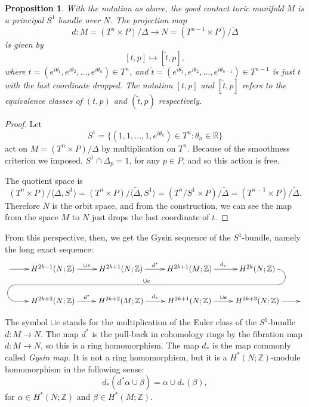 \documentclass[12pt]{amsart}
\newtheorem{proposition}[theorem]{Proposition}
\theoremstyle{definition}
\numberwithin{equation}{section}
\begin{document}
\begin{proposition}\label{S1 bundle}
With the notation as above, the good contact toric manifold $M$ is a
principal $S^{1}$ bundle over $N$. The projection map
\[d: M=(T^n\times P)/\Delta \rightarrow  N=(T^{n-1}\times P)/\widetilde{\Delta}\]
is given by
\[[t,p]\mapsto [\tilde{t},p],\]
where $t=(e^{i\theta_{1}},e^{i\theta_{2}},...,e^{i\theta_{n}})\in
T^n$, and
$\tilde{t}=(e^{i\theta_{1}},e^{i\theta_{2}},...,e^{i\theta_{n-1}})\in
T^{n-1}$ is just $t$ with the last coordinate dropped. The notation
$[t,p]$ and $[\tilde{t},p]$ refers to the equivalence classes of
$(t,p)$ and $(\tilde{t},p)$ respectively.
\end{proposition}
\begin{proof}
Let
\begin{equation}
S^1=\{(1,1,...,1,e^{i\theta_{n}})\in T^n: \theta_{n}\in {{\mathbb{R}}}\}
\end{equation}
act on $M=(T^n\times P)/\Delta$ by multiplication on $T^n$. Because
of the smoothness criterion we imposed, $S^1\cap \Delta_{p}=1$, for
any $p\in P$, and so this action is free.

The quotient space is
\begin{equation}
(T^n\times P)/\langle \Delta, S^1\rangle = (T^n\times P)/\langle
\widetilde{\Delta}, S^1 \rangle = (T^n/S^1\times
P)/\widetilde{\Delta} = (T^{n-1}\times P)/\widetilde{\Delta}.
\end{equation}
Therefore $N$ is the orbit space, and from the construction, we can
see the map from the space $M$ to $N$ just drops the last coordinate
of $t$.
\end{proof}

From this perspective, then, we get the Gysin sequence of the
$S^1$-bundle, namely the long exact sequence:
\[
\xymatrix{
   \ar[r]^{} & H^{2k-1}(N;{{\mathbb{Z}}}) \ar[r]^{\cup e} & H^{2k+1}(N;{{\mathbb{Z}}}) \ar[r]^{d^{*}} & H^{2k+1}(M;{{\mathbb{Z}}}) \ar[r]^{d_{*}} &
   H^{2k}(N;{{\mathbb{Z}}})\ar`r[d]`[l] `[lllld]_{\cup e}`[dlll][dlll]
&\\
&H^{2k+2}(N;{{\mathbb{Z}}}) \ar[r]^{d^{*}} & H^{2k+2}(M;{{\mathbb{Z}}}) \ar[r]^{d_{*}} &
H^{2k+1}(N;{{\mathbb{Z}}}) \ar[r]^{\cup e}& H^{2k+3}(N;{{\mathbb{Z}}}) \ar[r] & }\]

The symbol $\cup e$ stands for the multiplication of the Euler class
of the $S^1$-bundle $d: M\rightarrow N$. The map $d^{*}$ is the
pull-back in cohomology rings by the fibration map $d: M\rightarrow
N$, so this is a ring homomorphism. The map $d_{*}$ is the map
commonly called {\em Gysin map}. It is not a ring homomorphism, but
it is a $H^{*}(N;{{\mathbb{Z}}})$-module homomorphism in the following sense:
\begin{equation}\label{eq:push-pull}
d_{*}(d^{*}\alpha \cup \beta)= \alpha\cup d_{*}(\beta),
\end{equation}
for $\alpha\in H^{*}(N;{{\mathbb{Z}}})$ and $\beta\in H^{*}(M;{{\mathbb{Z}}})$.
\end{document}
